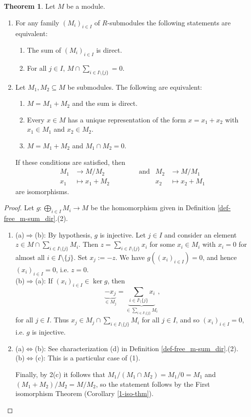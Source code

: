 \documentclass[12pt,a4paper]{report}
\theoremstyle{definition}
\newtheorem{theorem}{Theorem}[chapter] %
\theoremstyle{num.custom-title}
\DeclareMathOperator{\imp}{\Rightarrow}
\DeclareMathOperator{\sm}{\setminus}
\DeclareMathOperator{\sse}{\subseteq}
\renewcommand{\iff}{\Leftrightarrow}
\begin{document}
\addtocounter{theorem}{-1} %

\begin{theorem}
Let $M$ be a module.
\begin{enumerate}
\item For any family $(M_i)_{i \in I}$ of $R$-submodules the following statements are equivalent:
\begin{enumerate}
\item The sum of $(M_i)_{i \in I}$ is direct.
\item For all $j \in I$, $M \cap \sum_{i \in I \sm \{j\}} = 0$.
\end{enumerate}
\item Let $M_1,M_2 \sse M$ be submodules. The following are equivalent:
\begin{enumerate}
\item $M = M_1+M_2$ and the sum is direct.
\item Every $x \in M$ has a unique representation of the form $x = x_1+x_2$ with $x_1 \in M_1$ and $x_2 \in M_2$.
\item $M=M_1+M_2$ and $M_1 \cap M_2 = 0$.
\end{enumerate}
If these conditions are satisfied, then
\begin{align*}
M_1 &\to M/M_2  \quad \quad \quad \quad \quad \text{and}  &M_2 &\to M/M_1 \\
x_1 &\mapsto x_1+M_2    &x_2 &\mapsto x_2+M_1
\end{align*}
are isomorphisms.
\end{enumerate}
\begin{proof}
Let $g : \bigoplus_{i \in I} M_i \to M$ be the homomorphism given in Definition \ref{def-free_m-sum_dir}.(2).
\begin{enumerate}
\item (a)$\imp$(b): By hypothesis, $g$ is injective. Let $j \in I$ and consider an element $z \in M \cap \sum_{i \in I \sm \{j\}} M_i$. Then $z = \sum_{i \in I \sm \{j\}} x_i$ for some $x_i \in M_i$ with $x_i = 0$ for almost all $i \in I \sm \{j\}$. Set $x_j := -z$. We have $g((x_i)_{i \in I})=0$, and hence $(x_i)_{i \in I} = 0$, i.e. $z=0$.\\
(b)$\imp$(a): If $(x_i)_{i \in I} \in \ker g$, then 
\[
\underbrace{-x_j}_{\in M_j} = \underbrace{\sum_{i \in I \sm \{j\}} x_i}_{\in \sum_{i \in I \sm \{j\}} M_i},
\]
for all $j \in I$. Thus $x_j \in M_j \cap \sum_{i \in I \sm \{j\}} M_i$ for all $j \in I$, and so $(x_i)_{i \in I} =0$, i.e. $g$ is injective.
\item (a)$\iff$(b): See characterization (d) in Definition \ref{def-free_m-sum_dir}.(2).\\
(b)$\iff$(c): This is a particular case of (1).

Finally, by 2(c) it follows that $M_1/(M_1 \cap M_2) = M_1/0 = M_1$ and $(M_1+M_2)/M_2 = M/M_2$, so the statement follows by the First isomorphism Theorem (Corollary \ref{1-iso-thm}).
\end{enumerate}
\end{proof}
\end{theorem}
\end{document}
